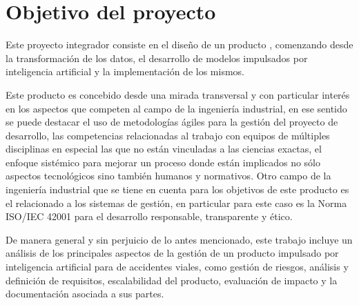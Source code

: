 \section{Objetivo del proyecto}\label{objetivo-del-proyecto}

Este proyecto integrador consiste en el diseño de un producto , comenzando desde la transformación de los datos, el desarrollo de modelos impulsados por inteligencia artificial y la implementación de los mismos.

Este producto es concebido desde una mirada transversal y con particular interés en los aspectos que competen al campo de la ingeniería industrial, en ese sentido se puede destacar el uso de metodologías ágiles para la gestión del proyecto de desarrollo, las competencias relacionadas al trabajo con equipos de múltiples disciplinas en especial las que no están vinculadas a las ciencias exactas, el enfoque sistémico para mejorar un proceso donde están implicados no sólo aspectos tecnológicos sino también humanos y normativos. Otro campo de la ingeniería industrial que se tiene en cuenta para los objetivos de este producto es el relacionado a los sistemas de gestión, en particular para este caso es la Norma ISO/IEC 42001 para el desarrollo responsable, transparente y ético.

De manera general y sin perjuicio de lo antes mencionado, este trabajo incluye un análisis de los principales aspectos de la gestión de un producto impulsado por inteligencia artificial para  de accidentes viales, como gestión de riesgos, análisis y definición de requisitos, escalabilidad del producto, evaluación de impacto y la documentación asociada a sus partes.
